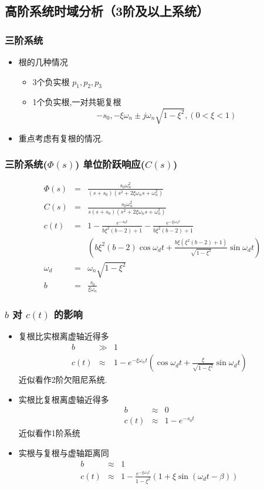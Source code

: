 \documentclass{article}
\begin{document}
\subsection{高阶系统时域分析（3阶及以上系统）}
\label{sec-1-5}
\begin{frame}
\frametitle{三阶系统}
\label{sec-1-5-1}

\begin{itemize}
\item <2-> 根的几种情况
\begin{itemize}
\item <3-> 3个负实根 $p_1,p_2,p_3$
\item <4-> 1个负实根,一对共轭复根 
       \[-s_0,-\xi\omega_n\pm j\omega_n\sqrt{1-\xi^2},(0<\xi<1)\]
\end{itemize}
\item <5-> 重点考虑有复根的情况.
\end{itemize}
\end{frame}
\begin{frame}
\frametitle{三阶系统($\Phi(s)$) 单位阶跃响应($C(s)$)}
\label{sec-1-5-2}

\begin{eqnarray*}
 \Phi(s) & = & \frac{s_0\omega_n^2}{(s+s_0)(s^2+2\xi\omega_n s+\omega_n^2)} \\
 C(s) &=& \frac{s_0\omega_n^2}{s(s+s_0)(s^2+2\xi\omega_n s+\omega_n^2)} \\
 c(t) &=& 1-\frac{e^{-s_0 t}}{b\xi^2(b-2)+1}-\frac{e^{-\xi\omega_n t}}{b\xi^2(b-2)+1} \\
     & & \left(b\xi^2(b-2)\cos\omega_d t + \frac{b\xi(\xi^2(b-2)+1)}{\sqrt{1-\xi^2}}\sin\omega_d t\right) \\
 \omega_d &=& \omega_n\sqrt{1-\xi^2} \\
 b &=& \frac{s_0}{\xi\omega_n}
\end{eqnarray*}
\end{frame}
\begin{frame}
\frametitle{$b$ 对 $c(t)$ 的影响}
\label{sec-1-5-3}


\begin{itemize}
\item <2->复根比实根离虚轴近得多
      \begin{eqnarray*}
      b & \gg & 1\\
      c(t) &\approx & 1-e^{-\xi\omega_n t}\left(\cos\omega_d t + \frac{\xi}{\sqrt{1-\xi^2}}\sin\omega_d t\right) 
      \end{eqnarray*}
      近似看作2阶欠阻尼系统.
\item <3->实根比复根离虚轴近得多
      \begin{eqnarray*}
      b & \approx & 0\\
      c(t) &\approx & 1-e^{-s_0 t}
      \end{eqnarray*}
      近似看作1阶系统
\item <4->实根与复根与虚轴距离同
      \begin{eqnarray*}
      b & \approx & 1\\
      c(t) &\approx & 1-\frac{e^{-\xi\omega_n t}}{1-\xi^2}\left(1+\xi\sin(\omega_d t-\beta)\right) 
      \end{eqnarray*}
\end{itemize}
\end{frame}
\end{document}
